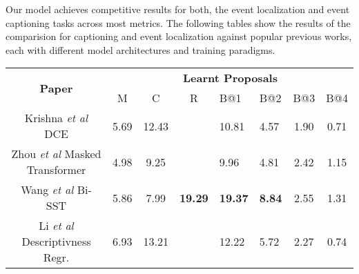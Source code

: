 Our model achieves competitive results for both, the event localization and event captioning tasks across most metrics. The following tables show the results of the comparision for captioning and event localization against popular previous works, each with different model architectures and training paradigms.
\begin{table}[] \label{table:capeval}
	\centering
	\begin{tabular}{|c|cclllcc|}
		\hline
		\multirow{2}{*}{\textbf{Paper}}        & \multicolumn{7}{c|}{\textbf{Learnt Proposals}}                                                                                                                                                                                                                        \\ \cline{2-8} 
		& \multicolumn{1}{c|}{M}             & \multicolumn{1}{c|}{C}              & \multicolumn{1}{c|}{R}               & \multicolumn{1}{l|}{B@1}             & \multicolumn{1}{l|}{B@2}           & \multicolumn{1}{c|}{B@3}           & B@4                                \\ \hline
		{Krishna \textit{et al} \cite{krishna2017densecaptioning} DCE}                                 & \multicolumn{1}{c|}{5.69}          & \multicolumn{1}{c|}{12.43}          & \multicolumn{1}{l|}{}                & \multicolumn{1}{l|}{10.81}           & \multicolumn{1}{l|}{4.57}          & \multicolumn{1}{c|}{1.90}          & 0.71                               \\ \hline
		{Zhou \textit{et al} \cite{zhou2018end} Masked Transformer}                & \multicolumn{1}{c|}{4.98}          & \multicolumn{1}{c|}{9.25}           & \multicolumn{1}{l|}{}                & \multicolumn{1}{l|}{9.96}            & \multicolumn{1}{l|}{4.81}          & \multicolumn{1}{c|}{2.42}          & 1.15                               \\ \hline
		{Wang \textit{et al} \cite{wang2018bidirectional} Bi-SST}                       & \multicolumn{1}{c|}{5.86}          & \multicolumn{1}{c|}{7.99}           & \multicolumn{1}{l|}{\textbf{19.29}}           & \multicolumn{1}{l|}{\textbf{19.37}}           & \multicolumn{1}{l|}{\textbf{8.84}}          & \multicolumn{1}{c|}{2.55}          & 1.31                               \\ \hline
		{Li \textit{et al} \cite{li2018jointly} Descriptivness Regr.}          & \multicolumn{1}{c|}{6.93}          & \multicolumn{1}{c|}{13.21}          & \multicolumn{1}{l|}{}                & \multicolumn{1}{l|}{12.22}           & \multicolumn{1}{l|}{5.72}          & \multicolumn{1}{c|}{2.27}          & 0.74                               \\ \hline

\end{tabular}
\end{table}
